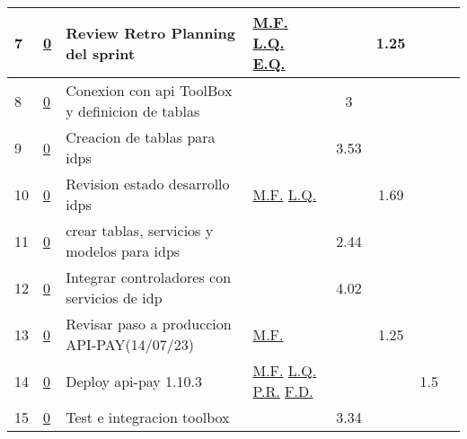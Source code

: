\documentclass{article}
\begin{document}
\begin{longtable}{|m{0.5cm}|m{1.2cm}|p{6cm}|m{1.5cm}||c|c|c|c||}
                 \label{7}7  &  \hyperref[0]{\color{blue}0}  & Review Retro Planning del sprint &  
                  \hyperref[M.F.]{\color{blue}M.F.} \newline  \hyperref[L.Q.]{\color{blue}L.Q.} \newline  \hyperref[E.Q.]{\color{blue}E.Q.}  &  & 1.25 &  & \\ \hline 

                 \label{8}8  &  \hyperref[0]{\color{blue}0}  & Conexion con api ToolBox y definicion de tablas &  
                 & 3 &  &  & \\ \hline 

                 \label{9}9  &  \hyperref[0]{\color{blue}0}  & Creacion de tablas para idps &  
                 & 3.53 &  &  & \\ \hline 

                 \label{10}10  &  \hyperref[0]{\color{blue}0}  & Revision estado desarrollo idps &  
                  \hyperref[M.F.]{\color{blue}M.F.} \newline  \hyperref[L.Q.]{\color{blue}L.Q.}  &  & 1.69 &  & \\ \hline 

                 \label{11}11  &  \hyperref[0]{\color{blue}0}  & crear tablas, servicios y modelos para idps &  
                 & 2.44 &  &  & \\ \hline 

                 \label{12}12  &  \hyperref[0]{\color{blue}0}  & Integrar controladores con servicios de idp &  
                 & 4.02 &  &  & \\ \hline 

                 \label{13}13  &  \hyperref[0]{\color{blue}0}  & Revisar paso a produccion API-PAY(14/07/23) &  
                  \hyperref[M.F.]{\color{blue}M.F.}  &  & 1.25 &  & \\ \hline 

                 \label{14}14  &  \hyperref[0]{\color{blue}0}  & Deploy api-pay 1.10.3 &  
                  \hyperref[M.F.]{\color{blue}M.F.} \newline  \hyperref[L.Q.]{\color{blue}L.Q.} \newline  \hyperref[P.R.]{\color{blue}P.R.} \newline  \hyperref[F.D.]{\color{blue}F.D.}  &  &  & 1.5 & \\ \hline 

                 \label{15}15  &  \hyperref[0]{\color{blue}0}  & Test e integracion toolbox &  
                 & 3.34 &  &  & \\ \hline 


\end{longtable}
\end{document}
